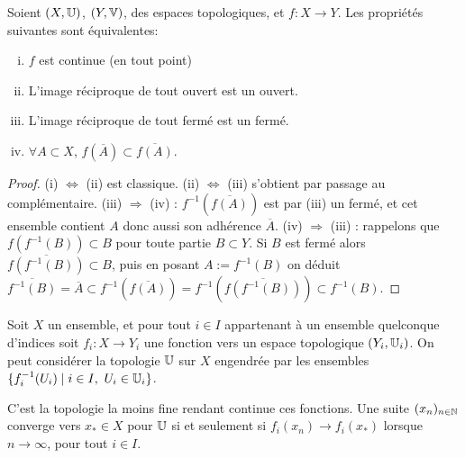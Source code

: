 


\begin{proposition}
\label{prop:caract_cont}
%
Soient $(X,\mathbb{U})$, $(Y,\mathbb{V})$, des espaces topologiques, et $f : X \to Y$. Les propriétés suivantes sont équivalentes:
\begin{enumerate}[(i)]
	\item $f$ est continue (en tout point)
	\item L'image réciproque de tout ouvert est un ouvert. 
	\item L'image réciproque de tout fermé est un fermé. 
	\item $\forall A \subset X$, $f(\overline A) \subset \overline {f(A)}$.  
\end{enumerate}
\end{proposition}

\begin{proof}
	(i) $\Leftrightarrow$ (ii) est classique. 
	(ii) $\Leftrightarrow$ (iii) s'obtient par passage au complémentaire. 
	(iii) $\Rightarrow$ (iv) : $f^{-1}(\overline {f(A)})$ est par (iii) un fermé, et cet ensemble contient $A$ donc aussi son adhérence $\overline A$. (iv) $\Rightarrow$ (iii) : rappelons que $f(f^{-1}(B)) \subset B$ pour toute partie $B\subset Y$. Si $B$ est fermé alors $\overline {f(f^{-1}(B))} \subset B$, puis en posant $A := f^{-1}(B)$ on déduit $\overline {f^{-1}(B)} = \overline A \subset f^{-1}(\overline {f(A)}) = f^{-1}(\overline {f(f^{-1}(B))}) \subset f^{-1}(B)$. %
\end{proof}



\begin{remark}
\label{rem:topoFunc}
Soit $X$ un ensemble, et pour tout $i \in I$ appartenant à un ensemble quelconque d'indices soit $f_i : X \to Y_i$ une fonction vers un espace topologique $(Y_i,\mathbb{U}_i)$.
On peut considérer la topologie $\mathbb{U}$ sur $X$ engendrée par les ensembles $\{f_i^{-1}(U_i) \mid i \in I,\ U_i \in \mathbb{U}_i\}$.

C'est la topologie la moins fine rendant continue ces fonctions. Une suite $(x_n)_{n \in \mathbb{N}}$ converge vers $x_*\in X$ pour $\mathbb{U}$ si et seulement si $f_i(x_n) \to f_i(x_*)$ lorsque $n \to \infty$, pour tout $i \in I$.
\end{remark}

